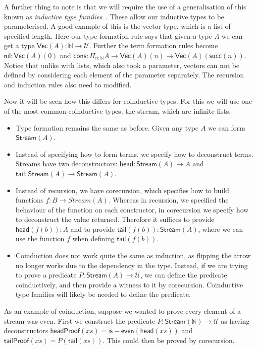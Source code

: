 \documentclass[draft]{article}
\begin{document}
A further thing to note is that we will require the use of a
generalisation of this known as \emph{inductive type
  families}~\cite[Section 5.7]{hottbook}. These allow our inductive
types to be parameterised. A good example of this is the vector type,
which is a list of specified length. Here our type formation rule says
that given a type \(A\) we can get a type \(\mathsf{Vec}(A) :
\mathbb{N} \to \mathcal{U}\). Further the term formation rules become
\(\mathsf{nil} : \mathsf{Vec}(A)(0)\) and \(\mathsf{cons} : \Pi_{n :
  \mathbb{N}} A \to \mathsf{Vec}(A)(n) \to
\mathsf{Vec}(A)(\mathsf{succ}(n))\). Notice that unlike with lists,
which also took a parameter, vectors can not be defined by considering
each element of the parameter separately. The recursion and induction
rules also need to modified.

Now it will be seen how this differs for coinductive types. For this
we will use one of the most common coinductive types, the stream,
which are infinite lists.

\begin{itemize}
\item Type formation remains the same as before. Given any type \(A\)
  we can form \(\mathsf{Stream}(A)\).
\item Instead of specifying how to form terms, we specify how to
  deconstruct terms. Streams have two deconstructors: \(\mathsf{head}
  : \mathsf{Stream}(A) \to A\) and \(\mathsf{tail} :
  \mathsf{Stream}(A) \to \mathsf{Stream}(A)\).
\item Instead of recursion, we have corecursion, which specifies how
  to build functions \(f : B \to Stream(A)\). Whereas in recursion, we
  specified the behaviour of the function on each constructor, in
  corecursion we specify how to deconstruct the value returned.
  Therefore it suffices to provide \(\mathsf{head}(f(b)) : A\) and to
  provide \(\mathsf{tail}(f(b)) : \mathsf{Stream}(A)\), where we can
  use the function \(f\) when defining \(\mathsf{tail}(f(b))\).
\item Coinduction does not work quite the same as induction, as
  flipping the arrow no longer works due to the dependency in the
  type. Instead, if we are trying to prove a predicate \(P :
  \mathsf{Stream}(A) \to \mathcal{U}\), we can define the predicate
  coinductively, and then provide a witness to it by corecursion.
  Coinductive type families will likely be needed to define the
  predicate.
\end{itemize}

As an example of coinduction, suppose we wanted to prove every element
of a stream was even. First we construct the predicate \(P :
\mathsf{Stream}(\mathbb{N}) \to \mathcal{U}\) as having deconstructors
\(\mathsf{headProof}(xs) = \mathsf{is{-}even}(\mathsf{head}(xs))\) and
\(\mathsf{tailProof}(xs) = P(\mathsf{tail}(xs))\). This could then be
proved by corecursion.
\end{document}
